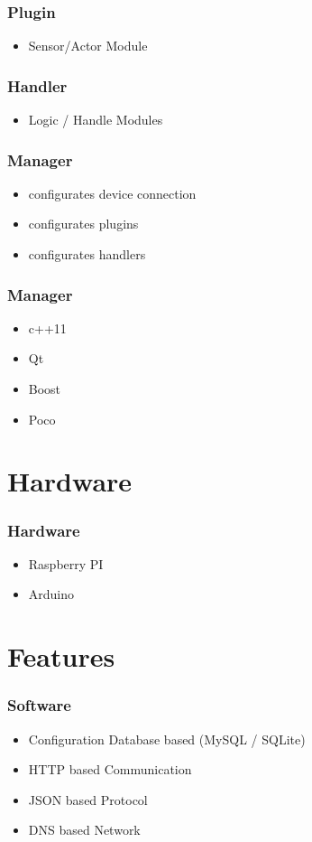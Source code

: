 \begin{frame}
	\frametitle{Plugin}
	\begin{itemize}
		\item Sensor/Actor Module
	\end{itemize}
\end{frame}

\begin{frame}
	\frametitle{Handler}
	\begin{itemize}
		\item Logic / Handle Modules
	\end{itemize}
\end{frame}

\begin{frame}
	\frametitle{Manager}
	\begin{itemize}
		\item configurates device connection
		\item configurates plugins
		\item configurates handlers
	\end{itemize}
\end{frame}

\begin{frame}
	\frametitle{Manager}
	\begin{itemize}
		\item c++11
		\item Qt
		\item Boost
		\item Poco
	\end{itemize}
\end{frame}

\section{Hardware}
\begin{frame}
	\frametitle{Hardware}
	\begin{itemize} 
		\item Raspberry PI
		\item Arduino
	\end{itemize}
\end{frame}

\section{Features}
\begin{frame}
	\frametitle{Software}
	\begin{itemize}
		\item Configuration Database based (MySQL / SQLite)
		\item HTTP based Communication
		\item JSON based Protocol
		\item DNS based Network
	\end{itemize}
\end{frame}

